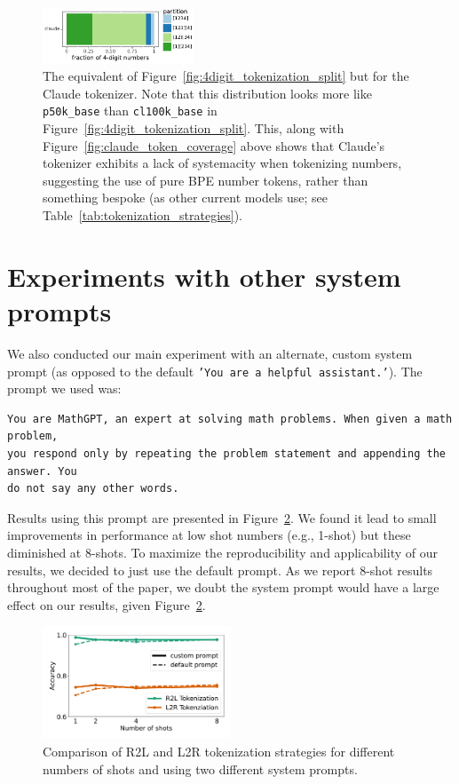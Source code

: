 \documentclass{article}
\theoremstyle{plain}
\theoremstyle{definition}
\theoremstyle{remark}
\begin{document}
\begin{figure}[H]
    \centering
    \includegraphics[width=0.4\textwidth]{figures/claude_4digit_no_ws_partitions.pdf}
    \caption{The equivalent of Figure~\ref{fig:4digit_tokenization_split} but for the Claude tokenizer. Note that this distribution looks more like \texttt{p50k\_base} than \texttt{cl100k\_base} in Figure~\ref{fig:4digit_tokenization_split}. This, along with Figure~\ref{fig:claude_token_coverage} above shows that Claude's tokenizer exhibits a lack of systemacity when tokenizing numbers, suggesting the use of pure BPE number tokens, rather than something bespoke (as other current models use; see Table~\ref{tab:tokenization_strategies}).}
    \label{fig:claude_4digit_partitions}
\end{figure}


\section{Experiments with other system prompts}
\label{appx:mathgpt_prompt}

We also conducted our main experiment with an alternate, custom system prompt (as opposed to the default \texttt{'You are a helpful assistant.'}). The prompt we used was: 

\begin{verbatim}
You are MathGPT, an expert at solving math problems. When given a math problem, 
you respond only by repeating the problem statement and appending the answer. You 
do not say any other words. 
\end{verbatim}

Results using this prompt are presented in Figure~\ref{fig:mathgpt}. We found it lead to small improvements in performance at low shot numbers (e.g., 1-shot) but these diminished at 8-shots. To maximize the reproducibility and applicability of our results, we decided to just use the default prompt. As we report 8-shot results throughout most of the paper, we doubt the system prompt would have a large effect on our results, given Figure~\ref{fig:mathgpt}.

\begin{figure}[H]
    \centering
    \includegraphics[width=0.5\textwidth]{figures/r2l_v_l2r_w_shots_v_mathgpt.pdf}
    \caption{Comparison of R2L and L2R tokenization strategies for different numbers of shots and using two different system prompts.}
    \label{fig:mathgpt}
\end{figure}
\end{document}

